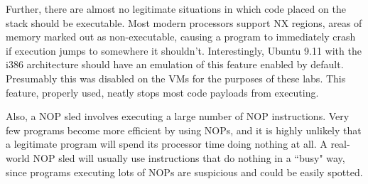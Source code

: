 Further, there are almost no legitimate situations in which code placed on the stack should be executable. Most modern
processors support NX regions, areas of memory marked out as non-executable, causing a program to immediately crash if
execution jumps to somewhere it shouldn't. Interestingly, Ubuntu 9.11 with the i386 architecture should have an
emulation of this feature enabled by default. %
Presumably this was disabled on the VMs for the purposes of these labs. This feature, properly used, neatly stops most
code payloads from executing.

Also, a NOP sled involves executing a large number of NOP instructions. Very few programs become more efficient by using
NOPs,%
and it is highly unlikely that a legitimate program will spend its processor time doing nothing at all. A real-world NOP
sled will usually use instructions that do nothing in a ``busy" way, %
since programs executing lots of NOPs are suspicious and could be easily spotted.

